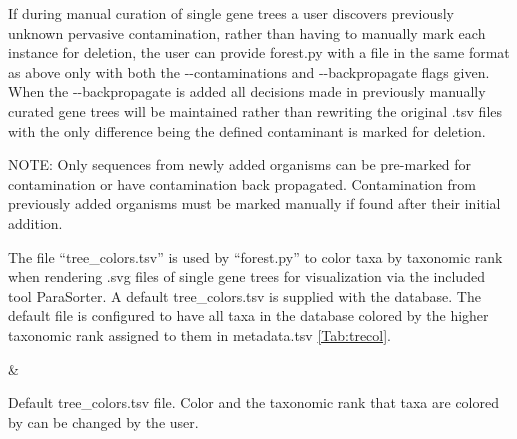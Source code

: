 \documentclass{article}
\begin{document}
\begin{enumerate}[itemsep=12pt]
\begin{description}
            If during manual curation of single gene trees a user discovers previously unknown pervasive contamination, rather than having to manually mark each instance for deletion, the user can provide forest.py with a file in the same format as above only with both the -\/-contaminations and -\/-backpropagate flags given. When the -\/-backpropagate is added all decisions made in previously manually curated gene trees will be maintained rather than rewriting the original .tsv files with the only difference being the defined contaminant is marked for deletion.
            
            \vspace{0.2cm}
            NOTE: Only sequences from newly added organisms can be pre-marked for contamination or have contamination back propagated. Contamination from previously added organisms must be marked manually if found after their initial addition. 
        \end{description}
        
    The file “tree\_colors.tsv” is used by “forest.py” to color taxa by taxonomic rank when rendering .svg files of single gene trees for visualization via the included tool ParaSorter. A default tree\_colors.tsv is supplied with the database. The default file is configured to have all taxa in the database colored by the higher taxonomic rank assigned to them in metadata.tsv \autoref{Tab:trecol}.
    
        \begin{center}
        \begin{table}[H]
        \centering
                {\csvcoli & \csvcolii}
            \captionsetup{width=.89\textwidth}
            \caption{Default tree\_colors.tsv file. Color and the taxonomic rank that taxa are colored by can be changed by the user.}
        \label{Tab:trecol}
        \end{table}
        \end{center}
        

\end{enumerate}
\end{document}
